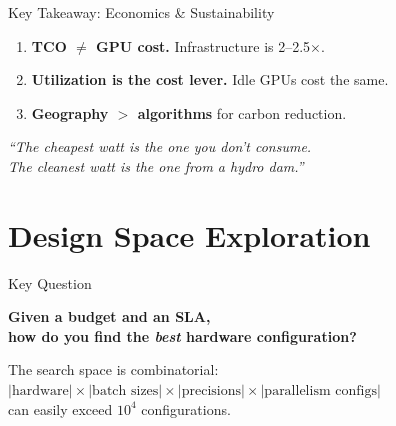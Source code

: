 \documentclass[aspectratio=169, 12pt]{beamer}
\begin{document}
\begin{frame}{Key Takeaway: Economics \& Sustainability}
\begin{center}
\Large
\begin{enumerate}
  \item \textbf{TCO $\neq$ GPU cost.} Infrastructure is 2--2.5$\times$.
  \item \textbf{Utilization is the cost lever.} Idle GPUs cost the same.
  \item \textbf{Geography $>$ algorithms} for carbon reduction.
\end{enumerate}

\vspace{1em}
\normalsize
\textit{``The cheapest watt is the one you don't consume.\\
The cleanest watt is the one from a hydro dam.''}
\end{center}
\end{frame}


\section{Design Space Exploration}

\begin{frame}{Key Question}
\begin{center}
\Large\bfseries
Given a budget and an SLA,\\[4pt]
how do you find the \emph{best} hardware configuration?
\end{center}
\vfill
\small
The search space is combinatorial:
$|\text{hardware}| \times |\text{batch sizes}| \times |\text{precisions}| \times |\text{parallelism configs}|$\\
can easily exceed $10^4$ configurations.
\end{frame}
\end{document}
